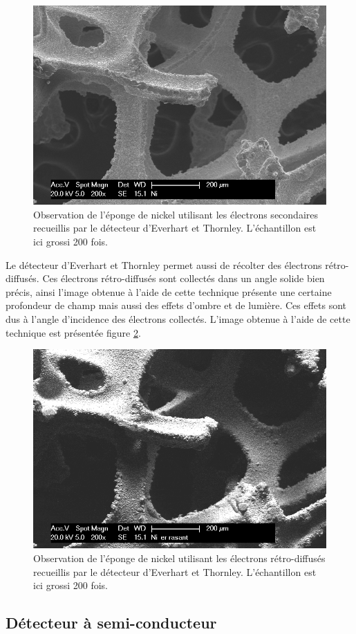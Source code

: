 \documentclass[a4paper,12pt]{article}
\newcommand\ett{Everhart et Thornley\xspace}
\begin{document}
\begin{figure}
\centering
\includegraphics[width = 0.7 \textwidth]{images/ni_es.png}
\caption{Observation de l'éponge de nickel utilisant les électrons secondaires recueillis par le détecteur d'\ett. L'échantillon est ici grossi 200 fois.}
\label{fig:ni_es}
\end{figure}

Le détecteur d'\ett permet aussi de récolter des électrons rétro-diffusés. Ces électrons rétro-diffusés sont
collectés dans un angle solide bien précis, ainsi l'image obtenue à l'aide de cette technique présente une
certaine profondeur de champ mais aussi des effets d'ombre et de lumière. Ces effets sont dus à l'angle
d'incidence des électrons collectés. L'image obtenue à l'aide de cette technique est présentée figure
\ref{fig:ni_er_rasant}.

\begin{figure}
\centering
\includegraphics[width = 0.7 \textwidth]{images/ni_er_rasant.png}
\caption{Observation de l'éponge de nickel utilisant les électrons rétro-diffusés recueillis par le détecteur d'\ett. L'échantillon est ici grossi 200 fois.}
\label{fig:ni_er_rasant}
\end{figure}


\subsection{Détecteur à semi-conducteur}
\end{document}
